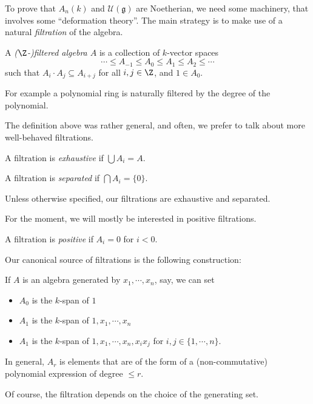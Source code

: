 \documentclass[a4paper]{article}
\begin{document}
To prove that $A_n(k)$ and $\mathcal{U}(\mathfrak{g})$ are Noetherian, we need some machinery, that involves some ``deformation theory''. The main strategy is to make use of a natural \emph{filtration} of the algebra.

\begin{defi}
  A \emph{($\Z$-)filtered algebra $A$} is a collection of $k$-vector spaces
  \[
    \cdots \leq A_{-1} \leq A_0 \leq A_1 \leq A_2 \leq \cdots
  \]
  such that $A_i \cdot A_j \subseteq A_{i + j}$ for all $i, j \in \Z$, and $1 \in A_0$.
\end{defi}
For example a polynomial ring is naturally filtered by the degree of the polynomial.

The definition above was rather general, and often, we prefer to talk about more well-behaved filtrations.
\begin{defi}
  A filtration is \emph{exhaustive} if $\bigcup A_i = A$.
\end{defi}

\begin{defi}
  A filtration is \emph{separated} if $\bigcap A_i = \{0\}$.
\end{defi}
Unless otherwise specified, our filtrations are exhaustive and separated.

For the moment, we will mostly be interested in positive filtrations.

\begin{defi}
  A filtration is \emph{positive} if $A_i = 0$ for $i < 0$.
\end{defi}

Our canonical source of filtrations is the following construction:
\begin{eg}
  If $A$ is an algebra generated by $x_1, \cdots, x_n$, say, we can set
  \begin{itemize}
    \item $A_0$ is the $k$-span of $1$
    \item $A_1$ is the $k$-span of $1, x_1, \cdots, x_n$
    \item $A_1$ is the $k$-span of $1, x_1, \cdots, x_n, x_i x_j$ for $i, j \in \{1, \cdots, n\}$.
  \end{itemize}
  In general, $A_r$ is elements that are of the form of a (non-commutative) polynomial expression of degree $\leq r$.
\end{eg}
Of course, the filtration depends on the choice of the generating set.
\end{document}

